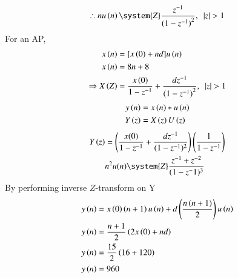 \documentclass[journal,12pt,twocolumn]{IEEEtran}
\theoremstyle{remark}
\begin{document}
\begin{align}
    \therefore nu\brak{n} \system{Z} \dfrac{z^{-1}}{{(1-z^{-1})}^2}, \,\,\,|z|>1
\end{align}
For an AP,
\begin{align}
    x\brak n &=[ x\brak 0 + nd ]u\brak n    \\
    x\brak n&=8n+8  \\
    \Rightarrow X\brak Z &= \dfrac{x\brak 0}{1-z^{-1}} + \dfrac{dz^{-1}}{{(1-z^{-1})}^{2}}, \,\,\,|z|>1 
\end{align}
\begin{align}
    y\left(n\right)&=x\left(n\right)\ast u\left(n\right)\\
    Y\left(z\right)&=X\left(z\right)U\left(z\right)
\end{align}
\begin{align}
    Y\brak{z}&=\brak{\dfrac{x(0)}{1-z^{-1}} + \dfrac{dz^{-1}}{(1-z^{-1})^{2}}}\brak{\dfrac{1}{1-z^{-1}}}\\
    &n^2u(n)\system{Z} \dfrac{z^{-1}+z^{-2}}{(1-z^-1)^3}
 \end{align}
 By performing inverse $Z$-transform on Y
\begin{align}
    y\left(n\right)&=x\left(0\right)\left(n+1\right)u\left(n\right)+d\left(\dfrac{{n\left(n+1\right)}}{2}\right)u\left(n\right)   \\
    y\left(n\right)&=\dfrac{n+1}{2}\left(2x\left(0\right)+nd\right)   \\
    y\left(n\right) &= \dfrac{15}{2}\left(16+120\right)    \\
    y\left(n\right) &=960
 \end{align}

\end{document}
